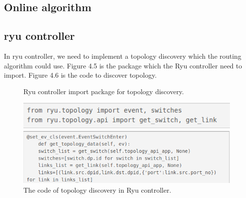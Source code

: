 \documentclass[a4paper,12pt]{report}
\begin{document}
\begin{large}
 	\section{Online algorithm}
 		\subsection{ryu controller}
 		\qquad In ryu controller, we need to implement a topology discovery which the routing algorithm could use. Figure 4.5 is the package which the Ryu controller need to import. Figure 4.6 is the code to discover topology.
 		\begin{figure}
          \caption{Ryu controller import package for topology discovery.}
          \centering
            \includegraphics[width=1.0\textwidth]{ryu_import.png}
          \caption{The code of topology discovery in Ryu controller.}
            \includegraphics[width=1.0\textwidth]{ryu_discovery.png}
      	\end{figure}
     \end{large}
    
\end{document}
